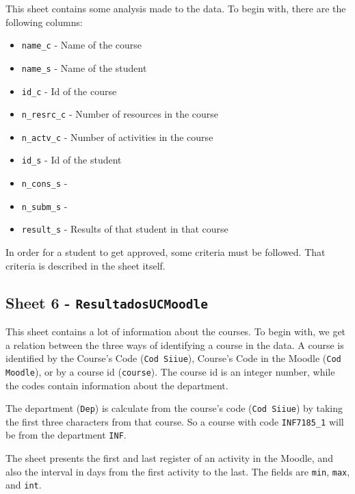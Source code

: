 This sheet contains some analysis made to the data. To begin with, there are
the following columns:

\begin{itemize}
    \item \texttt{name\_c} - Name of the course
    \item \texttt{name\_s} - Name of the student
    \item \texttt{id\_c} - Id of the course
    \item \texttt{n\_resrc\_c} - Number of resources in the course
    \item \texttt{n\_actv\_c} - Number of activities in the course
    \item \texttt{id\_s} - Id of the student
    \item \texttt{n\_cons\_s} - \TODO{}
    \item \texttt{n\_subm\_s} - \TODO{}
    \item \texttt{result\_s} - Results of that student in that course
\end{itemize}

In order for a student to get approved, some criteria must be followed. That
criteria is described in the sheet itself.

\subsection{Sheet 6 - \texttt{ResultadosUCMoodle}}


This sheet contains a lot of information about the courses. To begin with, we
get a relation between the three ways of identifying a course in the data. A
course is identified by the Course's Code (\texttt{Cod Siiue}), Course's Code
in the Moodle (\texttt{Cod Moodle}), or by a course id (\texttt{course}). The
course id is an integer number, while the codes contain information about the
department.

The department (\texttt{Dep}) is calculate from the course's code (\texttt{Cod
Siiue}) by taking the first three characters from that course. So a course with
code \texttt{INF7185\_1} will be from the department \texttt{INF}.

The sheet presents the first and last register of an activity in the Moodle,
and also the interval in days from the first activity to the last. The fields
are \texttt{min}, \texttt{max}, and \texttt{int}.



